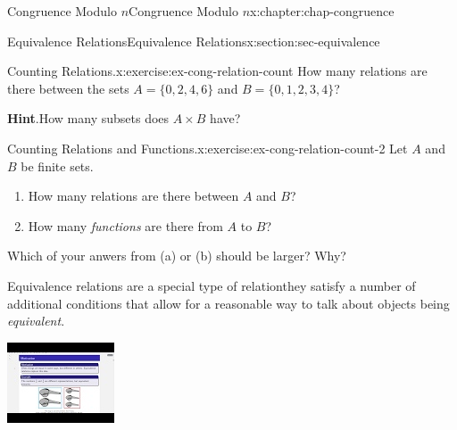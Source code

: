 \documentclass[oneside,10pt,]{book}
\newcommand{\blocktitlefont}{\relax}
\numberwithin{equation}{section}
\newlength{\qrsize}
\newlength{\previewwidth}
\begin{document}
\begin{chapterptx}{Congruence Modulo \(n\)}{}{Congruence Modulo \(n\)}{}{}{x:chapter:chap-congruence}
\begin{sectionptx}{Equivalence Relations}{}{Equivalence Relations}{}{}{x:section:sec-equivalence}
\begin{inlineexercise}{Counting Relations.}{x:exercise:ex-cong-relation-count}
How many relations are there between the sets \(A = \{0,2,4,6\}\) and \(B = \{0,1,2,3,4\}\)?%
\par\smallskip%
\noindent\textbf{\blocktitlefont Hint}.\hypertarget{g:hint:id535485}{}\quad{}How many subsets does \(A \times B\) have?%
\end{inlineexercise}%
\begin{inlineexercise}{Counting Relations and Functions.}{x:exercise:ex-cong-relation-count-2}%
Let \(A\) and \(B\) be finite sets.%
\begin{enumerate}[label=(\alph*)]
\item{}How many relations are there between \(A\) and \(B\)?%
\item{}How many \emph{functions} are there from \(A\) to \(B\)?%
\end{enumerate}
Which of your anwers from (a) or (b) should be larger? Why?%
\end{inlineexercise}%
Equivalence relations are a special type of relation\textemdash{}they satisfy a number of additional conditions that allow for a reasonable way to talk about objects being \emph{equivalent}.%
\begin{sidebyside}{1}{0}{0}{0}%
\begin{sbspanel}{1}%
\setlength{\qrsize}{9em}
\setlength{\previewwidth}{\linewidth}
\addtolength{\previewwidth}{-\qrsize}
\begin{tcbraster}[raster columns=2, raster column skip=1pt, raster halign=center, raster force size=false, raster left skip=0pt, raster right skip=0pt]%
\begin{tcolorbox}[previewstyle, width=\previewwidth]%
\includegraphics[width=0.80\linewidth,height=\qrsize,keepaspectratio]{images/video-equivalence-relation-1.jpg}%
\end{tcolorbox}%

\end{tcbraster}
\end{sbspanel}
\end{sidebyside}
\end{sectionptx}
\end{chapterptx}
\end{document}
